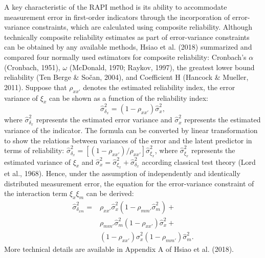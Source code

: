 \documentclass[
  man]{apa6}
\begin{document}
A key characteristic of the RAPI method is its ability to accommodate measurement error in first-order indicators through the incorporation of error-variance constraints, which are calculated using composite reliability. Although technically composite reliability estimates as part of error-variance constraints can be obtained by any available methods, Hsiao et al. (2018) summarized and compared four normally used estimators for composite reliability: Cronbach's \(\alpha\) (Cronbach, 1951), \(\omega\) (McDonald, 1970; Raykov, 1997), the greatest lower bound reliability (Ten Berge \& Sočan, 2004), and Coefficient H (Hancock \& Mueller, 2011). Suppose that \(\rho_{xx'}\) denotes the estimated reliability index, the error variance of \(\xi_{x}\) can be shown as a function of the reliability index:
\begin{equation}
\hat{\sigma}^2_{\delta_{x}} = (1 - \rho_{xx'})\hat{\sigma}^2_{{x}},
\end{equation}
where \(\hat{\sigma}^2_{\delta_{x}}\) represents the estimated error variance and \(\hat{\sigma}^2_{{x}}\) represents the estimated variance of the indicator. The formula can be converted by linear transformation to show the relations between variances of the error and the latent predictor in terms of reliability: \(\hat{\sigma}_{\delta_{x}}^2 = [(1 - \rho_{xx'})/{\rho_{xx'}}]\hat{\sigma}^2_{\xi_{x}}\), where \(\hat{\sigma}^2_{\xi_{x}}\) represents the estimated variance of \(\xi_{x}\) and \(\hat{\sigma}^2_{{x}} = {\hat{\sigma}^2_{\xi_{x}} + \hat{\sigma}^2_{\delta_{x}}}\) according classical test theory (Lord et al., 1968). Hence, under the assumption of independently and identically distributed measurement error, the equation for the error-variance constraint of the interaction term \(\xi_{x}\xi_{m}\) can be derived:
\begin{equation}
\begin{aligned}
\hat{\sigma}^2_{\delta_{xm}} = & \rho_{xx'}\hat{\sigma}^2_{{x}}(1 - \rho_{mm'}\hat{\sigma}^2_{{m}}) + \\&
                        \rho_{mm'}\hat{\sigma}^2_{{m}}(1-\rho_{xx'})\hat{\sigma}^2_{{x}} + \\&
                        (1 - \rho_{xx'})\hat{\sigma}^2_{{x}}(1 - \rho_{mm'})\hat{\sigma}^2_{{m}}. 
\end{aligned}
\end{equation}
More technical details are available in Appendix A of Hsiao et al. (2018).
\end{document}
